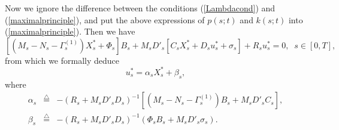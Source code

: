 \documentclass[final]{siamltex}
\begin{document}
Now we  ignore the difference between the conditions (\ref{Lambdacond}) and (\ref{maximalprinciple}), and put the above expressions of $p(s;t)$ and $k(s;t)$ into (\ref{maximalprinciple}). Then  we have
$$[(M_s-N_s-\Gamma^{(1)}_s) X^*_s+\Phi_s]B_s+M_sD'_s[C_sX^*_s+D_su^*_s+\sigma_s]+R_su^*_s=0,\;\;s\in [0,T],$$
from which we formally deduce
\begin{equation}\label{ustars}
u^*_s=\alpha_s X^*_s+\beta_s,
\end{equation}
where
\begin{eqnarray*}
\alpha_s&{\stackrel{\triangle}{=}}&  -(R_s+M_sD'_sD_s)^{-1}[(M_s-N_s-\Gamma_s^{(1)})B_s+M_sD'_sC_s],\\
\beta_s&{\stackrel{\triangle}{=}}& -(R_s+M_sD'_sD_s)^{-1}(\Phi_sB_s+M_sD'_s\sigma_s).
\end{eqnarray*}
\end{document}
